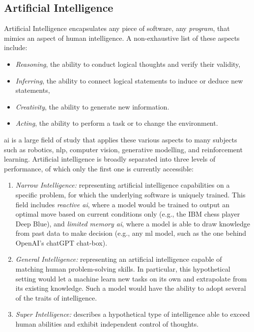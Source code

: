 \subsection{Artificial Intelligence}
Artificial Intelligence encapsulates any piece of software, any \textit{program}, that mimics an aspect of human intelligence. A non-exhaustive list of these aspects include: 
\begin{itemize}
    \item \textit{Reasoning}, the ability to conduct logical thoughts and verify their validity, 
    \item \textit{Inferring}, the ability to connect logical statements to induce or deduce new statements,
    \item \textit{Creativity}, the ability to generate new information. 
    \item \textit{Acting}, the ability to perform a task or to change the environment.
\end{itemize}
\gls{ai} is a large field of study that applies these various aspects to many subjects such as robotics, \gls{nlp}, computer vision, generative modelling, and reinforcement learning. Artificial intelligence is broadly separated into three levels of performance, of which only the first one is currently accessible: 
\begin{enumerate}
    \item \textit{Narrow Intelligence:} representing artificial intelligence capabilities on a specific problem, for which the underlying software is uniquely trained. This field includes \textit{reactive \gls{ai}}, where a model would be trained to output an optimal move based on current conditions only (e.g., the IBM chess player Deep Blue), and \textit{limited memory \gls{ai}}, where a model is able to draw knowledge from past data to make decision (e.g., any \gls{ml} model, such as the one behind OpenAI's chatGPT chat-box).
    \item \textit{General Intelligence:} representing an artificial intelligence capable of matching human problem-solving skills. In particular, this hypothetical setting would let a machine learn new tasks on its own and extrapolate from its existing knowledge. Such a model would have the ability to adopt several of the traits of intelligence.
    \item \textit{Super Intelligence:} describes a hypothetical type of intelligence able to exceed human abilities and exhibit independent control of thoughts. 
\end{enumerate}

